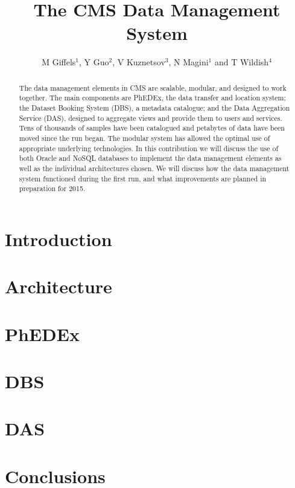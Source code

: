 \documentclass[a4paper]{jpconf}
\begin{document}
\title{The CMS Data Management System}

\author{M Giffels$^1$, Y Guo$^2$, V Kuznetsov$^3$,
        N Magini$^1$ and T Wildish$^4$}

\address{$^1$ CERN, CH-1211 Gen\`eve 23, Switzerland }
\address{$^2$ Fermi National Accelerator Laboratory, Batavia, Il, USA }
\address{$^3$ Cornell University, Ithaca, NY, USA }
\address{$^4$ Princeton University, Princeton, NJ, USA }


\begin{abstract}
The data management elements in CMS are scalable, modular, and designed to work together. The main components are PhEDEx, the data transfer and location system; the Dataset Booking System (DBS), a metadata catalogue; and the Data Aggregation Service (DAS), designed to aggregate views and provide them to users and services. Tens of thousands of samples have been catalogued and petabytes of data have been moved since the run began. The modular system has allowed the optimal use of appropriate underlying technologies. In this contribution we will discuss the use of both Oracle and NoSQL databases to implement the data management elements as well as the individual architectures chosen. We will discuss how the data management system functioned during the first run, and what improvements are planned in preparation for 2015.
\end{abstract}

\section{Introduction}


\section{Architecture}


\section{PhEDEx}


\section{DBS}


\section{DAS}


\section{Conclusions}


\par

\end{document}
